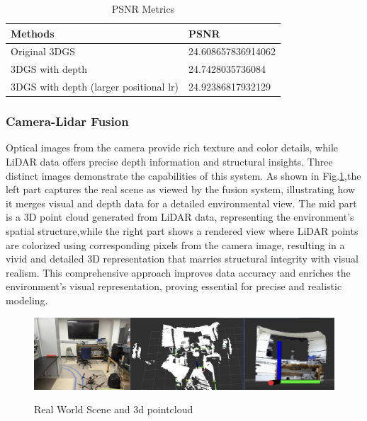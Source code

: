 \documentclass[conference]{IEEEtran}
\begin{document}
\begin{table}[htbp]
\centering
\begin{tabular}{@{}ll@{}}
\toprule
\textbf{Methods} & \textbf{PSNR} \\ 
\midrule
Original 3DGS &  24.608657836914062\\ 
3DGS with depth &  24.7428035736084\\ 
3DGS with depth (larger positional lr) &  24.92386817932129\\ 
\bottomrule
\end{tabular}
\caption{PSNR Metrics}
\label{tab:psnr}
\end{table}

\subsubsection{Camera-Lidar Fusion}
Optical images from the camera provide rich texture and color details, while LiDAR data offers precise depth information and structural insights. Three distinct images demonstrate the capabilities of this system. As shown in Fig.\ref{lzn},the left part captures the real scene as viewed by the fusion system, illustrating how it merges visual and depth data for a detailed environmental view. The mid part is a 3D point cloud generated from LiDAR data, representing the environment's spatial structure,while the right part shows a rendered view where LiDAR points are colorized using corresponding pixels from the camera image, resulting in a vivid and detailed 3D representation that marries structural integrity with visual realism. This comprehensive approach improves data accuracy and enriches the environment's visual representation, proving essential for precise and realistic modeling.
\begin{figure}[htbp]
    \centering
    \resizebox{9cm}{2cm}
    {\includegraphics{figures/lzn.png}}
    \caption{Real World Scene and 3d pointcloud}
    \label{lzn}
\end{figure}
\end{document}

